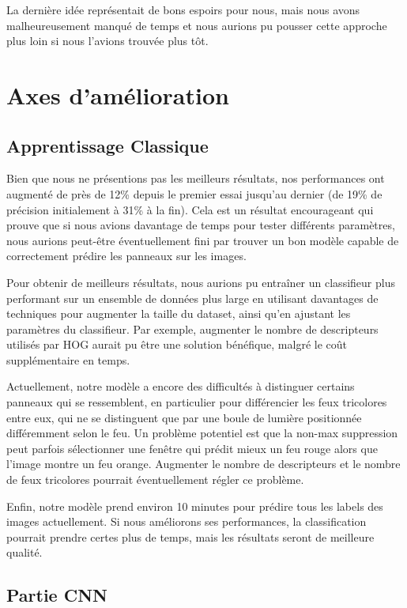 \documentclass[twocolumn,10pt]{article}
\begin{document}
    La dernière idée représentait de bons espoirs pour nous, mais nous avons malheureusement manqué de temps et nous aurions pu pousser cette approche plus loin si nous l'avions trouvée plus tôt.

    \section{Axes d'amélioration}
    \subsection{Apprentissage Classique}
    Bien que nous ne présentions pas les meilleurs résultats, nos performances ont augmenté de près de 12\% depuis le premier essai jusqu'au dernier (de 19\% de précision initialement à 31\% à la fin). Cela est un résultat encourageant qui prouve que si nous avions davantage de temps pour tester différents paramètres, nous aurions peut-être éventuellement fini par trouver un bon modèle capable de correctement prédire les panneaux sur les images.

    Pour obtenir de meilleurs résultats, nous aurions pu entraîner un classifieur plus performant sur un ensemble de données plus large en utilisant davantages de techniques pour augmenter la taille du dataset, ainsi qu'en ajustant les paramètres du classifieur. Par exemple, augmenter le nombre de descripteurs utilisés par HOG aurait pu être une solution bénéfique, malgré le coût supplémentaire en temps.

    Actuellement, notre modèle a encore des difficultés à distinguer certains panneaux qui se ressemblent, en particulier pour différencier les feux tricolores entre eux, qui ne se distinguent que par une boule de lumière positionnée différemment selon le feu. Un problème potentiel est que la non-max suppression peut parfois sélectionner une fenêtre qui prédit mieux un feu rouge alors que l'image montre un feu orange. Augmenter le nombre de descripteurs et le nombre de feux tricolores pourrait éventuellement régler ce problème.

    Enfin, notre modèle prend environ 10 minutes pour prédire tous les labels des images actuellement. Si nous améliorons ses performances, la classification pourrait prendre certes plus de temps, mais les résultats seront de meilleure qualité.

    \subsection{Partie CNN}
\end{document}
